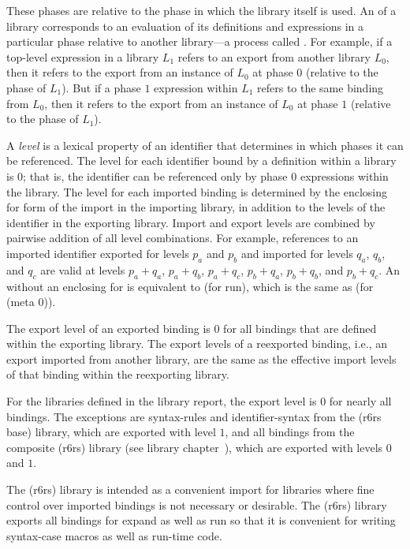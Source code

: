 These phases are relative to the phase in which the library itself is
used.
An  of a library corresponds to an evaluation of its
definitions and expressions in a particular phase relative to another
library---a process called .
For example, if a top-level expression in a library $L_1$ refers to
an export from another library $L_0$, then it refers to the export from an
instance of $L_0$ at phase $0$ (relative to the phase of $L_1$).
But if a phase $1$ expression within $L_1$ refers to the same binding from
$L_0$, then it refers to the export from an instance of $L_0$ at phase $1$
(relative to the phase of $L_1$).

%
A \emph{level} is a lexical property of an identifier that determines
in which phases it can be referenced. The level for each identifier
bound by a definition within a library is $0$; that is, the identifier
can be referenced only by phase $0$ expressions within the library.
The level for each imported binding is determined by the enclosing {\cf
  for} form of the {\cf import} in the importing library, in
addition to the levels of the identifier in the exporting
library. Import and export levels are combined by pairwise addition of
all level combinations.  For example, references to an imported
identifier exported for levels $p_a$ and $p_b$ and imported for levels
$q_a$, $q_b$, and $q_c$ are valid at levels $p_a+q_a$, $p_a+q_b$,
$p_a+q_c$, $p_b+q_a$, $p_b+q_b$, and $p_b+q_c$. An 
without an enclosing {\cf for} is equivalent to {\cf (for
   run)}, which is the same as {\cf (for
   (meta 0))}.

The export level of an exported binding is $0$ for all bindings
that are defined within the exporting library. The export levels of a
reexported binding, i.e., an export imported from another library, are the
same as the effective import levels of that binding within the reexporting
library.

For the libraries defined in the library report, the export level is
$0$ for nearly all bindings. The exceptions are {\cf syntax-rules}
and {\cf identifier-syntax} 
from the {\cf (r6rs base)} library, which are exported
with level $1$, and all bindings from the composite {\cf (r6rs)}
library (see library chapter~), which are
exported with levels $0$ and $1$.

\begin{rationale} 
The {\cf (r6rs)} library is intended as a convenient import for libraries where fine
control over imported bindings is not necessary or desirable. The {\cf (r6rs)} library
exports all bindings for {\cf expand} as well as {\cf run} so that it is convenient
for writing {\cf syntax-case} macros as well as run-time code.
\end{rationale}

